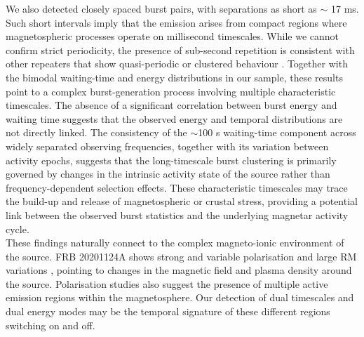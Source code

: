 \documentclass[preprint2, trackchanges]{aastex631}
\begin{document}
We also detected closely spaced burst pairs, with separations as short as $\sim$ 17 ms. Such short intervals imply that the emission arises from compact regions where magnetospheric processes operate on millisecond timescales. While we cannot confirm strict periodicity, the presence of sub-second repetition is consistent with other repeaters that show quasi-periodic or clustered behaviour \citep{Pastor, Faber}. Together with the bimodal waiting-time and energy distributions in our sample, these results point to a complex burst-generation process involving multiple characteristic timescales. The absence of a significant correlation between burst energy and waiting time suggests that the observed energy and temporal distributions are not directly linked. 
The consistency of the $\sim$100 s waiting-time component across widely separated observing frequencies, together with its variation between activity epochs, suggests that the long-timescale burst clustering is primarily governed by changes in the intrinsic activity state of the source rather than frequency-dependent selection effects. These characteristic timescales may trace the build-up and release of magnetospheric or crustal stress, providing a potential link between the observed burst statistics and the underlying magnetar activity cycle.
\\
These findings naturally connect to the complex magneto-ionic environment of the source. FRB 20201124A shows strong and variable polarisation \citep{Jiang2024, Hilmarsson_2021} and large RM variations \citep{Xu2022}, pointing to changes in the magnetic field and plasma density around the source. Polarisation studies also suggest the presence of multiple active emission regions within the magnetosphere. Our detection of dual timescales and dual energy modes may be the temporal signature of these different regions switching on and off.
\end{document}
